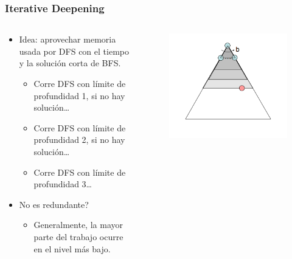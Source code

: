 \documentclass[10pt]{beamer}
\begin{document}
\begin{frame}
  \frametitle{Iterative Deepening}
  
  \begin{columns}
    \begin{column}{0.5\textwidth}
      \begin{itemize}
        \item Idea: aprovechar memoria usada por DFS con el tiempo y la solución corta de BFS.
          \begin{itemize}
            \item Corre DFS con límite de profundidad 1, si no hay solución\dots
            \item Corre DFS con límite de profundidad 2, si no hay solución\dots
            \item Corre DFS con límite de profundidad 3\dots
          \end{itemize}
        \item No es redundante?
          \begin{itemize}
            \item Generalmente, la mayor parte del trabajo ocurre en el nivel más bajo.
          \end{itemize}
      \end{itemize}
    \end{column}

    \begin{column}{0.5\textwidth}
      \begin{figure}[!h] 
        \centering
        \includegraphics[width=1\textwidth]{img/iter}
      \end{figure} 
    \end{column}
  \end{columns}

\end{frame}
\end{document}
